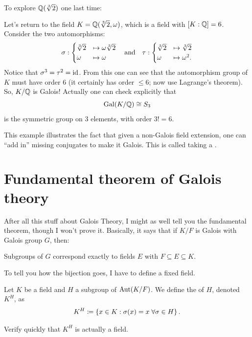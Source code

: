 To explore $\mathbb Q(\sqrt[3]{2})$ one last time:
\begin{example}
	Let's return to the field $K = \mathbb Q(\sqrt[3]{2}, \omega)$,
	which is a field with $[K:\mathbb Q] = 6$.
	Consider the two automorphisms:
	\[
		\sigma:
		\begin{cases}
			\sqrt[3]{2} &\mapsto \omega \sqrt[3]{2} \\
			\omega &\mapsto \omega
		\end{cases}
		\quad\text{and}\quad
		\tau:
		\begin{cases}
			\sqrt[3]{2} &\mapsto \sqrt[3]{2} \\
			\omega &\mapsto \omega^2.
		\end{cases}
	\]
	Notice that $\sigma^3 = \tau^2 = \mathrm{id}$.
	From this one can see that the automorphism group of $K$ must have order $6$
	(it certainly has order $\le 6$; now use Lagrange's theorem).
	So, $K/\mathbb Q$ is Galois! Actually one can check explicitly that
	\[ \operatorname{Gal}(K/\mathbb Q) \cong S_3 \]
	is the symmetric group on $3$ elements, with order $3! = 6$.
\end{example}
This example illustrates the fact that
given a non-Galois field extension,
one can ``add in'' missing conjugates to make it Galois.
This is called taking a .

\section{Fundamental theorem of Galois theory}
After all this stuff about Galois Theory, I might as well tell you the fundamental theorem,
though I won't prove it.
Basically, it says that if $K/F$ is Galois with Galois group $G$, then:
\begin{moral}
	Subgroups of $G$ correspond exactly to fields $E$ with $F \subseteq E \subseteq K$.
\end{moral}

To tell you how the bijection goes, I have to define a fixed field.
\begin{definition}
	Let $K$ be a field and $H$ a subgroup of $\operatorname{Aut}(K/F)$.
	We define the  of $H$, denoted $K^H$, as
	\[ K^H \coloneqq \left\{ x \in K : \sigma(x)=x \; \forall \sigma \in H \right\}. \]
\end{definition}
\begin{ques}
	Verify quickly that $K^H$ is actually a field.
\end{ques}

